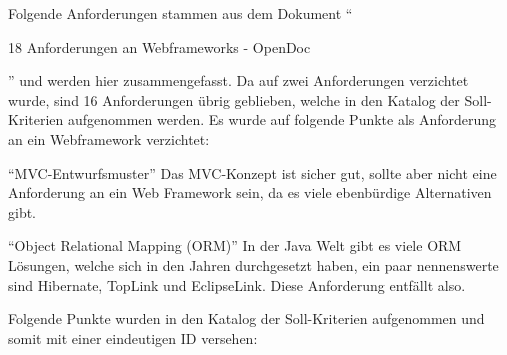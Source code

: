   Folgende Anforderungen stammen aus dem Dokument ``\begin{itshape}18
  Anforderungen an Webframeworks -
  OpenDoc\end{itshape}''\cite{AnforderungenAnWebframeworks} und werden hier
  zusammengefasst. Da auf zwei Anforderungen verzichtet wurde, sind 16
  Anforderungen übrig geblieben, welche in den Katalog der Soll-Kriterien
  aufgenommen werden. Es wurde auf folgende Punkte als Anforderung an ein
  Webframework verzichtet:
  \newline
  
  ``MVC-Entwurfsmuster''
  \newline
  \newline
  \noindent
  Das MVC-Konzept ist sicher gut, sollte aber nicht eine Anforderung an ein Web
  Framework sein, da es viele ebenbürdige Alternativen gibt.
  \newline
  
  ``Object Relational Mapping (ORM)''
  \newline
  \newline
  \noindent
  In der Java Welt gibt es viele ORM Lösungen, welche sich in den Jahren
  durchgesetzt haben, ein paar nennenswerte sind Hibernate, TopLink und
  EclipseLink. Diese Anforderung entfällt also.
  \newline
  
  Folgende Punkte wurden in den Katalog der Soll-Kriterien aufgenommen und somit
  mit einer eindeutigen ID versehen:

